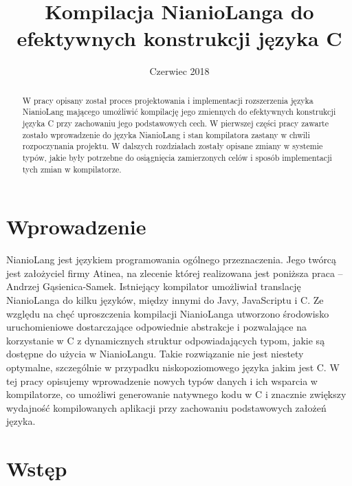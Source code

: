 \documentclass[licencjacka]{pracamgr}
\title{Kompilacja NianioLanga do efektywnych konstrukcji języka C}
\date{Czerwiec 2018}
\begin{document}
\maketitle

\begin{abstract}
W pracy opisany został proces projektowania i implementacji rozszerzenia języka NianioLang mającego umożliwić
kompilację jego zmiennych do efektywnych konstrukcji języka C przy zachowaniu jego podstawowych cech.
W pierwszej części pracy zawarte zostało wprowadzenie do języka NianioLang i stan kompilatora zastany w chwili
rozpoczynania projektu. W dalszych rozdziałach zostały opisane zmiany w systemie typów, jakie były potrzebne
do osiągnięcia zamierzonych celów i sposób implementacji tych zmian w kompilatorze.
\end{abstract}

\tableofcontents

\chapter*{Wprowadzenie}
  NianioLang jest językiem programowania ogólnego przeznaczenia. Jego twórcą jest
  założyciel firmy Atinea, na zlecenie której realizowana jest poniższa
  praca -- Andrzej Gąsienica-Samek.
  Istniejący kompilator umożliwiał translację NianioLanga do kilku języków,
  między innymi do Javy, JavaScriptu i C.
  Ze względu na chęć uproszczenia kompilacji NianioLanga
  utworzono środowisko uruchomieniowe dostarczające odpowiednie abstrakcje
  i pozwalające na korzystanie w C z dynamicznych struktur odpowiadających typom,
  jakie są dostępne do użycia w NianioLangu. Takie rozwiązanie nie jest
  niestety optymalne, szczególnie w przypadku niskopoziomowego języka jakim
  jest C. W tej pracy opisujemy wprowadzenie nowych typów danych i ich wsparcia
  w kompilatorze, co umożliwi generowanie natywnego kodu w C i znacznie
  zwiększy wydajność kompilowanych aplikacji przy zachowaniu podstawowych założeń języka.
\chapter{Wstęp}
\end{document}

